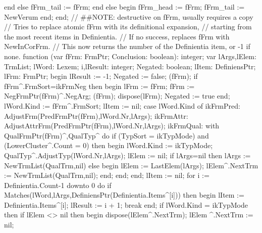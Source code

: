       end
      else fFrm_tail := fFrm;
   end
   else begin fFrm_head := fFrm; fFrm_tail := NewVerum end;
end;
\eatline
{}\nwendcode{}\nwdocspar
\nwenddocs{}\endmoddef\nwstartdeflinemarkup{}\nwenddeflinemarkup
// ##NOTE: destructive on fFrm, usually requires a copy
// Tries to replace atomic fFrm with its definitional expansion,
// starting from the most recent items in Definientia.
// If no success, replaces fFrm with NewInCorFrm.
// This now returns the number of the Definientia item, or -1 if none.
function (var fFrm: FrmPtr; Conclusion: boolean): integer;
var
   lArgs,lElem: TrmList;
   lWord: Lexem;
   i,lResult: integer;
   Negated: boolean;
   lItem: DefiniensPtr;
   lFrm: FrmPtr;
begin
   lResult :=  -1;
   Negated := false;
   (fFrm);
   if fFrm^.FrmSort=ikFrmNeg then
   begin
      lFrm := fFrm;
      fFrm := NegFrmPtr(fFrm)^.NegArg;
      (fFrm);
      dispose(lFrm);
      Negated := true
   end;
   lWord.Kind := fFrm^.FrmSort;
   lItem := nil;
   case lWord.Kind of
      ikFrmPred: AdjustFrm(PredFrmPtr(fFrm),lWord.Nr,lArgs);
      ikFrmAttr: AdjustAttrFrm(PredFrmPtr(fFrm),lWord.Nr,lArgs);
      ikFrmQual:
         with QualFrmPtr(fFrm)^,QualTyp^ do
         if (TypSort = ikTypMode) and (LowerCluster^.Count = 0) then
         begin
            lWord.Kind := ikTypMode;
            QualTyp^.AdjustTyp(lWord.Nr,lArgs);
            lElem := nil;
            if lArgs=nil then lArgs := NewTrmList(QualTrm,nil)
            else
            begin
               lElem := LastElem(lArgs);
               lElem^.NextTrm := NewTrmList(QualTrm,nil);
            end;
         end;
   end;
   lItem := nil;
   for i := Definientia.Count-1 downto 0 do
      if Matches(lWord,lArgs,DefiniensPtr(Definientia.Items^[i])) then
      begin lItem := Definientia.Items^[i]; lResult :=  i + 1; break end;
   if lWord.Kind = ikTypMode then
      if lElem <> nil then
      begin
         dispose(lElem^.NextTrm); 
         lElem ^.NextTrm := nil;
